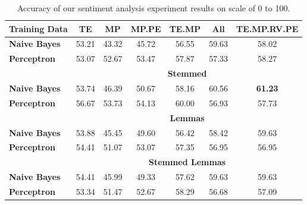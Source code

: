 \documentclass{IOS-Book-Article}
\begin{document}
\begin{table}[b]
    \begin{tabular}{lcccccc}
    \\ \hline
    \textbf{Training   Data} & \textbf{TE} & \textbf{MP} & \textbf{MP.PE} & \textbf{TE.MP} & \textbf{All} & \textbf{TE.MP.RV.PE} \\ \hline
    \textbf{Naive Bayes}     & 53.21       & 43.32       & 45.72          & 56.55          & 59.63                   & 58.02                \\
    \textbf{Perceptron}      & 53.07       & 52.67       & 53.47          & 57.87          & 57.33                   & 58.27                \\ \hline
                             & \multicolumn{6}{c}{\textbf{Stemmed}}                                                                         \\ \hline
    \textbf{Naive Bayes}     & 53.74       & 46.39       & 50.67          & 58.16          & 60.56                   & \textbf{61.23}       \\
    \textbf{Perceptron}      & 56.67       & 53.73       & 54.13          & 60.00          & 56.93                   & 57.73                \\ \hline
                             & \multicolumn{6}{c}{\textbf{Lemmas}}                                                                          \\ \hline
    \textbf{Naive Bayes}     & 53.88       & 45.45       & 49.60          & 56.42          & 58.42                   & 59.63                \\
    \textbf{Perceptron}      & 54.41       & 51.07       & 53.07          & 57.35          & 56.95                   & 56.95                \\ \hline
                             & \multicolumn{6}{c}{\textbf{Stemmed Lemmas}}                                                                  \\ \hline
    \textbf{Naive Bayes}     & 54.41       & 45.99       & 49.33          & 57.62          & 59.63                   & 59.63                \\
    \textbf{Perceptron}      & 53.34       & 51.47       & 52.67          & 58.29          & 56.68                   & 57.09                \\ \hline
    \end{tabular}
    \caption{Accuracy of our sentiment analysis experiment results on scale of 0 to 100.}
    \label{tab:sentiment-experiment}
\end{table}
\end{document}
